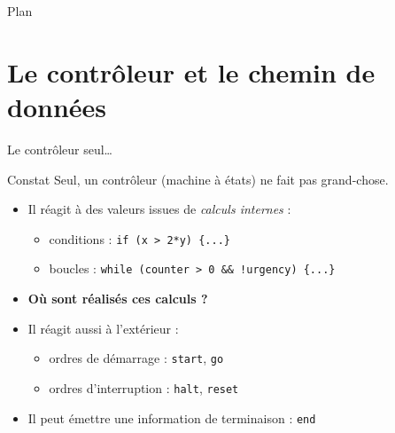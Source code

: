 
\begin{frame}{Plan}
  \tableofcontents
\end{frame}

\section{Le contr\^oleur et le chemin de donn\'ees}

\begin{frame}{Le contr\^oleur seul\dots}
  \begin{block}{Constat}
    Seul, un contr\^oleur (machine \`a \'etats) ne fait pas grand-chose.
  \end{block}
  \begin{itemize}
    \item Il r\'eagit \`a des valeurs issues de \emph{calculs internes} :
    \begin{itemize}
      \item conditions : \texttt{if (x > 2*y) \{...\}}
      \item boucles : \texttt{while (counter > 0 \&\& !urgency) \{...\}}
    \end{itemize}
    \item \textbf{O\`u sont r\'ealis\'es ces calculs ?}
    \item Il r\'eagit aussi \`a l'ext\'erieur :
    \begin{itemize}
      \item ordres de d\'emarrage : \texttt{start}, \texttt{go}
      \item ordres d'interruption : \texttt{halt}, \texttt{reset}
    \end{itemize}
    \item Il peut \'emettre une information de terminaison : \texttt{end}
  \end{itemize}
\end{frame}

